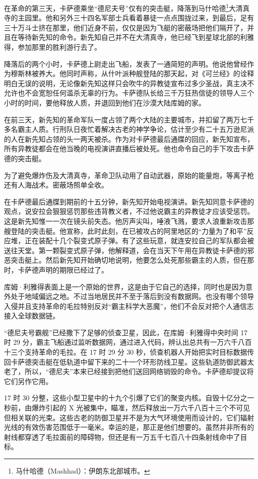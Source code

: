 \documentclass[AutoFakeBold=true]{book}
\begin{document}
在革命的第三天，卡萨德乘坐``德尼夫号''仅有的突击艇，降落到马什哈德\footnote{马什哈德（Mashhad）：伊朗东北部城市。}大清真寺的主园里。他和另外三十四名军部士兵看着暴徒一点点围拢过来，到最后，足有三十万斗士挤在那里，他们近身不前，仅仅是因为飞艇的密蔽场把他们隔开了，并且在等待新先知的命令。新先知自己并不在大清真寺，他已经飞到星球北部的利雅得，参加那里的胜利游行去了。

降落后的两个小时，卡萨德上尉走出飞船，发表了一通简短的声明。他说他曾经作为穆斯林被养大。他同时声称，从什叶派种舰登陆的那天起，对《可兰经》的诠释明白无误的说明，无论像新先知这样只会吹牛的异教徒宣布过多少圣战，真主决不允许也不会宽恕任何滥杀无辜的行为。卡萨德队长给三千万狂热信徒的领导人三个小时的时间，要他释放人质，并退回到他们在沙漠大陆库姆的家。

在前三天，新先知的革命军队一度占领了两个大陆的主要城市，并扣留了两万七千多名霸主人质。行刑队日夜忙着解决古老的神学争论，估计至少有二十五万逊尼派的人在新先知占领的头一两天被杀。作为对卡萨德最后通牒的回应，新先知宣布，所有异教徒都会在他当晚的电视演讲直播后被处死。他也命令自己的手下攻击卡萨德的突击艇。

为了避免爆炸伤及大清真寺，革命卫队动用了自动武器，原始的能量炮，等离子枪还有人海战术。密蔽场照单全收。

在卡萨德最后通牒到期前的十五分钟，新先知开始电视演讲。新先知同意卡萨德的观点，说安拉会狠狠惩罚那些违背教义者，不过他说霸主的异教徒才应该受惩罚。这是新先知惟一一次在镜头前失态。他厉声尖叫，唾液飞溅，要求人浪重新攻击那艘登陆的突击艇。他宣称，此时此刻，在已被攻占的阿里地区的``力量为了和平''反应堆，正在装配十几个裂变式原子弹。有了这些玩意，就连安拉自己的军队都会被送往天堂。第一颗裂变式原子弹，他解释道，会在当天下午用在异教徒卡萨德的邪恶突击艇上。然后新先知开始确切地说明，他要怎么处死那些霸主的人质，但在那时，卡萨德声明的期限已经过了。

库姆·利雅得表面上是一个原始的世界，这是由于它自己的选择，同时也是因为意外处于地域偏远之地。不过当地居民并不至于落后到没有数据网。也没有哪个领导入侵并且支持革命的毛拉特别反对``霸主科学大恶魔''，他们不会反对把个人通信志接入全球数据链。

``德尼夫号霸舰''已经撒下了足够的侦查卫星，因此，在库姆·利雅得中央时间 17 时 29 分，霸主飞船通过监听数据网，通过进入代码，辨认出总共有一万六千八百十三个支持革命的毛拉。在 17 时 29 分 30 秒，侦查机器人开始把实时目标数据传回卡萨德突击艇在低轨道中留下来的二十一个环形防线卫星。这些轨道防御武器太老了，所以，``德尼夫''本来已经接到把他们送回网络销毁的命令。卡萨德却提议将它们另作它用。

17 时 30 分整，这些小型卫星中的十九个引爆了它们的聚变内核。自毁十亿分之一秒前，由爆炸引起的 X 光被集中，瞄准，然后释放出一万六千八百十三个不可见但相关联的光束。这些古老的防御卫星并不是为大气环境使用而设计的，它们辐射光线的有效伤害范围低于一毫米。幸运的是，那正是他们想要的。虽然并非所有的射线都穿透了毛拉面前的障碍物，但还是有一万五千七百八十四条射线命中了目标。
\end{document}
